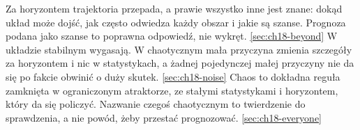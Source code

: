 %
  {Za horyzontem trajektoria przepada, a prawie wszystko inne jest znane: dokąd układ może dojść, jak często odwiedza każdy obszar i jakie są szanse. Prognoza podana jako szanse to poprawna odpowiedź, nie wykręt.}%
  {\ref{sec:ch18-beyond}}
%
  {W układzie stabilnym wygasają. W chaotycznym mała przyczyna zmienia szczegóły za horyzontem i nic w statystykach, a żadnej pojedynczej małej przyczyny nie da się po fakcie obwinić o duży skutek.}%
  {\ref{sec:ch18-noise}}
%
  {Chaos to dokładna reguła zamknięta w ograniczonym atraktorze, ze stałymi statystykami i horyzontem, który da się policzyć. Nazwanie czegoś chaotycznym to twierdzenie do sprawdzenia, a nie powód, żeby przestać prognozować.}%
  {\ref{sec:ch18-everyone}}
